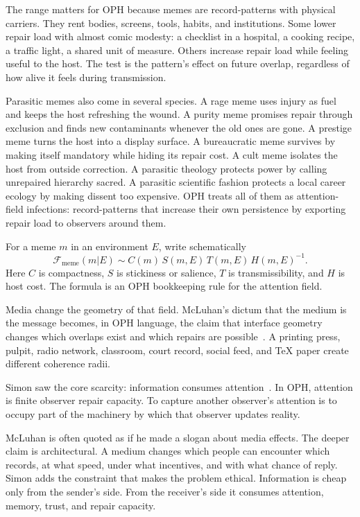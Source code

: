 \documentclass[11pt]{article}
\theoremstyle{remark}
\theoremstyle{plain}
\begin{document}
The range matters for OPH because memes are record-patterns with physical
carriers. They rent bodies, screens, tools, habits, and institutions. Some lower
repair load with almost comic modesty: a checklist in a hospital, a cooking
recipe, a traffic light, a shared unit of measure. Others increase repair load
while feeling useful to the host. The test is the pattern's effect on future
overlap, regardless of how alive it feels during transmission.

Parasitic memes also come in several species. A rage meme uses injury as fuel
and keeps the host refreshing the wound. A purity meme promises repair through
exclusion and finds new contaminants whenever the old ones are gone. A prestige
meme turns the host into a display surface. A bureaucratic meme survives by
making itself mandatory while hiding its repair cost. A cult meme isolates the
host from outside correction. A parasitic theology protects power by calling
unrepaired hierarchy sacred. A parasitic scientific fashion protects a local
career ecology by making dissent too expensive. OPH treats all of them as
attention-field infections: record-patterns that increase their own persistence
by exporting repair load to observers around them.

For a meme \(m\) in an environment \(E\), write schematically
\[
\mathcal F_{\mathrm{meme}}(m|E)
\sim
C(m)\,S(m,E)\,T(m,E)\,H(m,E)^{-1}.
\]
Here \(C\) is compactness, \(S\) is stickiness or salience, \(T\) is
transmissibility, and \(H\) is host cost. The formula is an OPH bookkeeping
rule for the attention field.

Media change the geometry of that field. McLuhan's dictum that the medium is
the message becomes, in OPH language, the claim that interface geometry changes
which overlaps exist and which repairs are possible~\cite{McLuhan1964}. A
printing press, pulpit, radio network, classroom, court record, social feed,
and TeX paper create different coherence radii.

Simon saw the core scarcity: information consumes attention~\cite{Simon1971}.
In OPH, attention is finite observer repair capacity. To capture another
observer's attention is to occupy part of the machinery by which that observer
updates reality.

McLuhan is often quoted as if he made a slogan about media effects. The deeper
claim is architectural. A medium changes which people can encounter which
records, at what speed, under what incentives, and with what chance of reply.
Simon adds the constraint that makes the problem ethical. Information is cheap
only from the sender's side. From the receiver's side it consumes attention,
memory, trust, and repair capacity.
\end{document}
